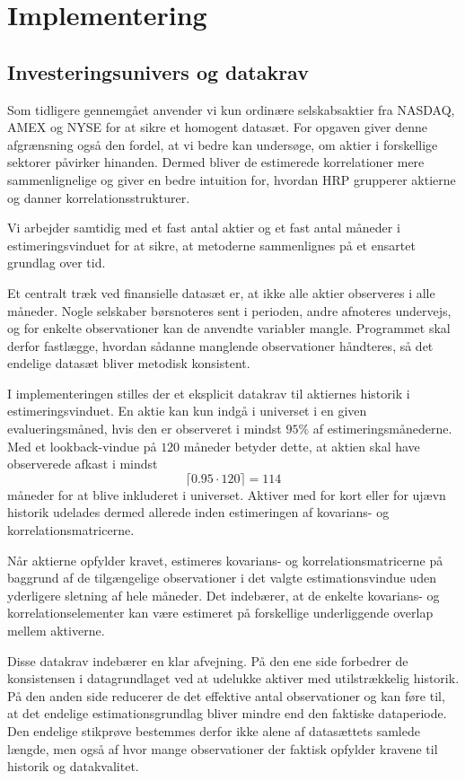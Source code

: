 \documentclass[../main.tex]{subfiles}
\begin{document}
\section{Implementering}

\subsection{Investeringsunivers og datakrav}
 

Som tidligere gennemgået anvender vi kun ordinære selskabsaktier fra NASDAQ, AMEX og NYSE for at sikre et homogent datasæt. For opgaven giver denne afgrænsning også den fordel, at vi bedre kan undersøge, om aktier i forskellige sektorer påvirker hinanden. Dermed bliver de estimerede korrelationer mere sammenlignelige og giver en bedre intuition for, hvordan HRP grupperer aktierne og danner korrelationsstrukturer.

Vi arbejder samtidig med et fast antal aktier og et fast antal måneder i estimeringsvinduet for at sikre, at metoderne sammenlignes på et ensartet grundlag over tid.


Et centralt træk ved finansielle datasæt er, at ikke alle aktier observeres i alle måneder. Nogle selskaber børsnoteres sent i perioden, andre afnoteres undervejs, og for enkelte observationer kan de anvendte variabler mangle. Programmet skal derfor fastlægge, hvordan sådanne manglende observationer håndteres, så det endelige datasæt bliver metodisk konsistent.

I implementeringen stilles der et eksplicit datakrav til aktiernes historik i estimeringsvinduet. En aktie kan kun indgå i universet i en given evalueringsmåned, hvis den er observeret i mindst $95\%$ af estimeringsmånederne. Med et lookback-vindue på $120$ måneder betyder dette, at aktien skal have observerede afkast i mindst
\[
\lceil 0.95 \cdot 120 \rceil = 114
\]
måneder for at blive inkluderet i universet. Aktiver med for kort eller for ujævn historik udelades dermed allerede inden estimeringen af kovarians- og korrelationsmatricerne.

Når aktierne opfylder kravet, estimeres kovarians- og korrelationsmatricerne på baggrund af de tilgængelige observationer i det valgte estimationsvindue uden yderligere sletning af hele måneder. Det indebærer, at de enkelte kovarians- og korrelationselementer kan være estimeret på forskellige underliggende overlap mellem aktiverne. 

Disse datakrav indebærer en klar afvejning. På den ene side forbedrer de konsistensen i datagrundlaget ved at udelukke aktiver med utilstrækkelig historik. På den anden side reducerer de det effektive antal observationer og kan føre til, at det endelige estimationsgrundlag bliver mindre end den faktiske dataperiode. Den endelige stikprøve bestemmes derfor ikke alene af datasættets samlede længde, men også af hvor mange observationer der faktisk opfylder kravene til historik og datakvalitet.
\end{document}
